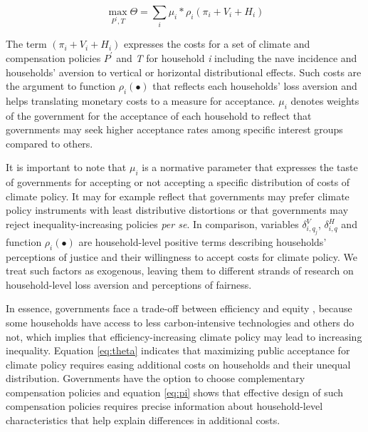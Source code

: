 \documentclass[12pt, a4paper]{article}
\begin{document}
\begin{equation} \label{eq:theta}
    \max_{P^{\prime},T} \Theta = \sum_{i} \mu_{i} * \rho_{i}(\pi_{i} + V_{i} + H_{i})
\end{equation}

The term $(\pi_{i} + V_{i} + H_{i})$ expresses the costs for a set of climate and compensation policies $P^{\prime}$ and \textit{T} for household \textit{i} including the nave incidence and households' aversion to vertical or horizontal distributional effects. Such costs are the argument to function $\rho_{i}(\bullet)$ that reflects each households' loss aversion \autocite{Tversky.1991} and helps translating monetary costs to a measure for acceptance. $\mu_{i}$ denotes weights of the government for the acceptance of each household to reflect that governments may seek higher acceptance rates among specific interest groups compared to others.

It is important to note that $\mu_{i}$ is a normative parameter that expresses the taste of governments for accepting or not accepting a specific distribution of costs of climate policy. It may for example reflect that governments may prefer climate policy instruments with least distributive distortions \autocite{Fischer.2019} or that governments may reject inequality-increasing policies \textit{per se}. In comparison, variables $\delta_{i,q_{j}}^{V}$, $\delta_{i,q}^{H}$ and function $\rho_{i}(\bullet)$ are household-level positive terms describing households' perceptions of justice and their willingness to accept costs for climate policy. We treat such factors as exogenous, leaving them to different strands of research on household-level loss aversion and perceptions of fairness. 

In essence, governments face a trade-off between efficiency and equity \autocite{Hansel.2022,TerryDinan.2016}, because some households have access to less carbon-intensive technologies and others do not, which implies that efficiency-increasing climate policy may lead to increasing inequality. Equation \ref{eq:theta} indicates that maximizing public acceptance for climate policy requires easing additional costs on households and their unequal distribution. Governments have the option to choose complementary compensation policies and equation \ref{eq:pi} shows that effective design of such compensation policies requires precise information about household-level characteristics that help explain differences in additional costs. 
\end{document}
